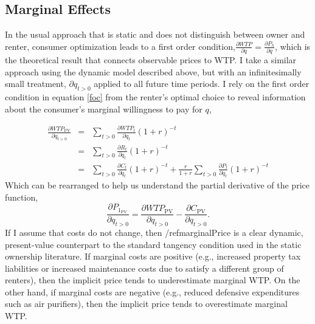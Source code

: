 \documentclass[ecta,nameyear,draft]{econsocart}
\theoremstyle{plain}
\theoremstyle{remark}
\begin{document}
\subsection{Marginal Effects}
In the usual approach that is static and does not distinguish between owner and renter, consumer optimization leads to a first order condition,$\frac{\partial{\mathit{WTP}}}{\partial q}=\frac{\partial P_h}{\partial q}$, which is the theoretical result that connects observable prices to WTP. I take a similar approach using the dynamic model described above, but with an infinitesimally small treatment, $\partial q_{t>0}$ applied to all future time periods. I rely on the first order condition in equation \ref{foc} from the renter's optimal choice to reveal information about the consumer's marginal willingness to pay for $q$,

\begin{eqnarray}
\frac{\partial \mathit{WTP}_{\mathrm{PV}}}{\partial q_{t>0}}&=&\sum_{t>0} \frac{\partial \mathit{WTP}_t}{\partial q_t}(1+r)^{-t}\label{pvmwtp}\nonumber\\ 
&=&\sum_{t>0} \frac{\partial R_t}{\partial q_t}(1+r)^{-t}\nonumber\\
&=&\sum_{t>0} \frac{\partial C_t}{\partial q_t}(1+r)^{-t}+\frac{r}{1+r}\sum_{t>0} \frac{\partial P_t}{\partial q_t}(1+r)^{-t}\nonumber
\end{eqnarray}
Which can be rearranged to help us understand the partial derivative of the price function,
\begin{equation}
	\frac{\partial P_{1_{\mathrm{PV}}}} {\partial q_{t>0}}=\frac{\partial \mathit{WTP}_{\mathrm{PV}}}{\partial q_{t>0}}-\frac{\partial C_{\mathrm{PV}}}{\partial q_{t>0}} \label{marginalPrice}.
\end{equation}
If I assume that costs do not change, then /ref{marginalPrice} is a clear dynamic, present-value counterpart to the standard tangency condition used in the static ownership literature. If marginal costs are positive (e.g., increased property tax liabilities or increased maintenance costs due to satisfy a different group of renters), then the implicit price tends to underestimate marginal WTP. On the other hand, if marginal costs are negative (e.g., reduced defensive expenditures such as air purifiers), then the implicit price tends to overestimate marginal WTP.
\end{document}
